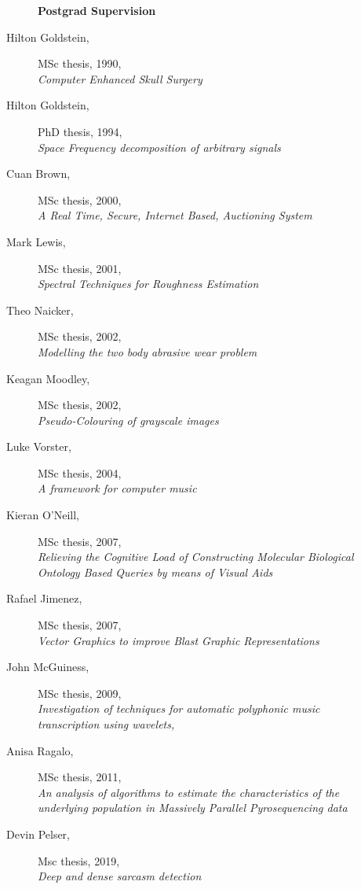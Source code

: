 \documentclass[12pt]{article}
\begin{document}
\newpage
\begin{multicols}{2}
\begin{description}\item[] \begin{description}\item[] {\large \bf   Postgrad Supervision}
\item[Hilton Goldstein,] MSc thesis, 1990, \\
      {\em Computer Enhanced Skull Surgery}
\item[Hilton Goldstein,] PhD thesis, 1994, \\
      {\em Space Frequency decomposition of arbitrary signals}
\item[Cuan Brown,] MSc thesis,  2000,\\
      {\em A Real Time, Secure, Internet Based, Auctioning System}
 \item[Mark Lewis,] MSc thesis, 2001, \\
      {\em Spectral Techniques for Roughness Estimation}
\item[Theo Naicker,]  MSc thesis, 2002, \\
      {\em Modelling the two body abrasive wear problem}
\item[Keagan Moodley,] MSc thesis, 2002, \\
      {\em Pseudo-Colouring of grayscale images}
\item[Luke Vorster,] MSc thesis, 2004, \\
       {\em A framework for computer music}
\item[Kieran O'Neill,] MSc thesis,  2007, \\
       {\it Relieving the Cognitive Load of Constructing Molecular
       Biological Ontology Based Queries by means of Visual Aids}
\item[Rafael Jimenez,] MSc thesis, 2007, \\
       {\em Vector Graphics to improve Blast Graphic
       Representations}
\item[John McGuiness,] MSc thesis, 2009, \\
       {\em Investigation of techniques for automatic polyphonic
       music transcription using wavelets,}
\item[Anisa Ragalo,] MSc thesis, 2011, \\
        {\em An analysis of algorithms to estimate the characteristics 
        of the underlying population in Massively Parallel Pyrosequencing data}
\item[Devin Pelser,] Msc thesis, 2019, \\
        {\em Deep and dense sarcasm detection}
\end{description}
\end{description}


\end{multicols}
\end{document}
